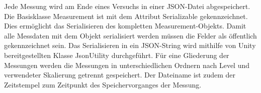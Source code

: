 Jede Messung wird am Ende eines Versuchs in einer JSON-Datei abgespeichert. Die Basisklasse Measurement ist mit dem Attribut Serializable gekennzeichnet. Dies ermöglicht das Serialisieren des kompletten Measurement-Objekts. Damit alle Messdaten mit dem Objekt serialisiert werden müssen die Felder als öffentlich gekennzeichnet sein. Das Serialisieren in ein JSON-String wird mithilfe von Unity bereitgestellten Klasse JsonUtility durchgeführt. Für eine Gliederung der Messungen werden die Messungen in unterschiedlichen Ordnern nach Level und verwendeter Skalierung getrennt gespeichert. Der Dateiname ist zudem der Zeitstempel zum Zeitpunkt des Speichervorganges der Messung.